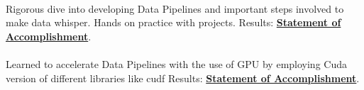 \documentclass[theme]{cv_einstein}
\begin{document}
\begin{paracol}{2}
\begin{leftcolumn*}
{{\begin{minipage}[l]{0.9\leftcolwidth}
                    \vspace{\itemspace}\\
                \end{minipage}
            }%
        } %
        \end{leftcolumn*}
        \begin{rightcolumn}\noindent \small
            \hspace{-2.4pt}
            {Rigorous dive into developing Data Pipelines and important steps involved to make data whisper. Hands on practice with projects.}
            {Results: \href{https://confirm.udacity.com/UTWXK4NQ}{\textbf{Statement of Accomplishment}}.
            }\\
            \vspace{\itemspace}\\
            {Learned to accelerate Data Pipelines with the use of GPU by employing Cuda version of different libraries like cudf}
            {Results: \href{https://courses.nvidia.com/certificates/8a411f544ec843c685e9c53de9135326/}{\textbf{Statement of Accomplishment}}.}\\
            \vspace{\itemspace}\\

\end{rightcolumn}
\end{paracol}
\end{document}
